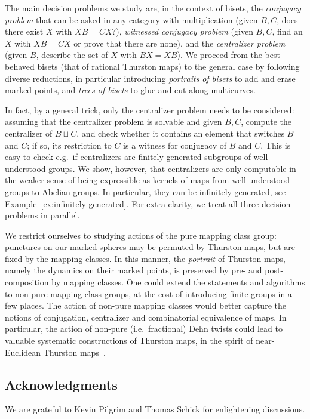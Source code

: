 \documentclass{amsart}
\begin{document}
The main decision problems we study are, in the context of bisets, the
\emph{conjugacy problem} that can be asked in any category with
multiplication (given $B,C$, does there exist $X$ with $X B=C X$?),
\emph{witnessed conjugacy problem} (given $B,C$, find an $X$ with
$X B=C X$ or prove that there are none), and the \emph{centralizer
  problem} (given $B$, describe the set of $X$ with $B X=X B$). We
proceed from the best-behaved bisets (that of rational Thurston maps)
to the general case by following diverse reductions, in particular
introducing \emph{portraits of bisets} to add and erase marked points,
and \emph{trees of bisets} to glue and cut along multicurves.

In fact, by a general trick, only the centralizer problem needs to be
considered: assuming that the centralizer problem is solvable and given
$B,C$, compute the centralizer of $B\sqcup C$, and check whether it
contains an element that switches $B$ and $C$; if so, its restriction to
$C$ is a witness for conjugacy of $B$ and $C$. This is easy to check e.g.\
if centralizers are finitely generated subgroups of well-understood
groups. We show, however, that centralizers are only computable in the
weaker sense of being expressible as kernels of maps from well-understood
groups to Abelian groups. In particular, they can be infinitely generated,
see Example~\ref{ex:infinitely generated}. For extra clarity, we treat all
three decision problems in parallel.

We restrict ourselves to studying actions of the pure mapping class group:
punctures on our marked spheres may be permuted by Thurston maps, but are
fixed by the mapping classes. In this manner, the \emph{portrait} of
Thurston maps, namely the dynamics on their marked points, is preserved by
pre- and post-composition by mapping classes. One could extend the
statements and algorithms to non-pure mapping class groups, at the cost of
introducing finite groups in a few places. The action of non-pure mapping
classes would better capture the notions of conjugation, centralizer and
combinatorial equivalence of maps. In particular, the action of non-pure
(i.e.\ fractional) Dehn twists could lead to valuable systematic
constructions of Thurston maps, in the spirit of near-Euclidean Thurston
maps~\cite{cannon-floyd-parry-pilgrim:net}.

\subsection{Acknowledgments}
We are grateful to Kevin Pilgrim and Thomas Schick for enlightening
discussions.
\end{document}
